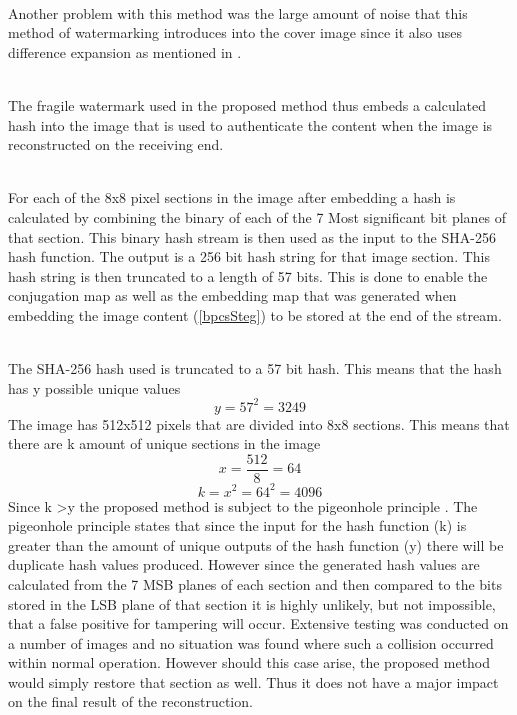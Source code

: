 \documentclass[12pt]{article}
\begin{document}
\hspace{0pt} \\
Another problem with this method was the large amount of noise that this method of watermarking introduces into the cover image since it also uses difference expansion as mentioned in \cite{tian2002reversible}.

\hspace{0pt} \\
The fragile watermark used in the proposed method thus embeds a calculated hash into the image that is used to authenticate the content when the image is reconstructed on the receiving end.

\hspace{0pt} \\
For each of the 8x8 pixel sections in the image after embedding a hash is calculated by combining the binary of each of the 7 Most significant bit planes of that section. This binary hash stream is then used as the input to the SHA-256 hash function.
The output is a 256 bit hash string for that image section.
This hash string is then truncated to a length of 57 bits.
This is done to enable the conjugation map as well as the embedding map that was generated when embedding the image content (\ref{bpcsSteg}) to be stored at the end of the stream.

\hspace{0pt} \\
The SHA-256 hash used is truncated to a 57 bit hash. 
This means that the hash has y possible unique values 
\[ y = 57^2 = 3249 \]
The image has 512x512 pixels that are divided into 8x8 sections.
This means that there are k amount of unique sections in the image
\[x = \frac{512}{8} = 64 \]
\[k = x^2 =64^2 = 4096 \]
Since k \textgreater y the proposed method is subject to the pigeonhole principle \cite{cook1976short}.
The pigeonhole principle states that since the input for the hash function (k) is greater than the amount of unique outputs of the hash function (y) there will be duplicate hash values produced.
However since the generated hash values are calculated from the 7 MSB planes of each section and then compared to the bits stored in the LSB plane of that section it is highly unlikely, but not impossible, that a false positive for tampering will occur.
Extensive testing was conducted on a number of images and no situation was found where such a collision occurred within normal operation.
However should this case arise, the proposed method would simply restore that section as well.
Thus it does not have a major impact on the final result of the reconstruction.
\end{document}

